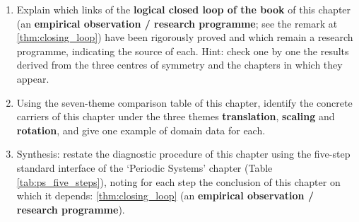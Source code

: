 \begin{enumerate}[leftmargin=3em, label=\textbf{Exercise \arabic*}]
    \item Explain which links of the \textbf{logical closed loop of the book} of this chapter (an \textbf{empirical observation / research programme}; see the remark at \ref{thm:closing_loop}) have been rigorously proved and which remain a research programme, indicating the source of each. Hint: check one by one the results derived from the three centres of symmetry and the chapters in which they appear.

    \item Using the seven-theme comparison table of this chapter, identify the concrete carriers of this chapter under the three themes \textbf{translation}, \textbf{scaling} and \textbf{rotation}, and give one example of domain data for each.

    \item Synthesis: restate the diagnostic procedure of this chapter using the five-step standard interface of the `Periodic Systems' chapter (Table \ref{tab:ps_five_steps}), noting for each step the conclusion of this chapter on which it depends: \ref{thm:closing_loop} (an \textbf{empirical observation / research programme}).
\end{enumerate}

